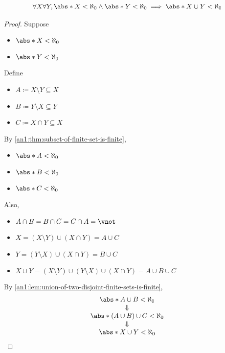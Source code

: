 \begin{lemma} \label{an1:lem:union-of-two-finite-sets-is-finite}
  \[
    \forall X \forall Y, \abs*{X} < \aleph_{0} \land \abs*{Y} < \aleph_{0}
    \implies \abs*{X \cup Y} < \aleph_{0}
  \]
\end{lemma}

\begin{proof}
  Suppose
  \begin{itemize}
    \item $\abs*{X} < \aleph_{0}$
    \item $\abs*{Y} < \aleph_{0}$
  \end{itemize}
  Define
  \begin{itemize}
    \item $A \coloneqq X \setminus Y \subseteq X$
    \item $B \coloneqq Y \setminus X \subseteq Y$
    \item $C \coloneqq X \cap Y \subseteq X$
  \end{itemize}
  By \cref{an1:thm:subset-of-finite-set-is-finite},
  \begin{itemize}
    \item $\abs*{A} < \aleph_{0}$
    \item $\abs*{B} < \aleph_{0}$
    \item $\abs*{C} < \aleph_{0}$
  \end{itemize}
  Also,
  \begin{itemize}
    \item $A \cap B = B \cap C = C \cap A = \vnot$
    \item $X = (X \setminus Y) \cup (X \cap Y) = A \cup C$
    \item $Y = (Y \setminus X) \cup (X \cap Y) = B \cup C$
    \item $X \cup Y = (X \setminus Y) \cup (Y \setminus X) \cup (X \cap Y) = A \cup B \cup C$
  \end{itemize}
  By \cref{an1:lem:union-of-two-disjoint-finite-sets-is-finite},
  \[
    \begin{array}{c}
      \abs*{A \cup B} < \aleph_{0}          \\
      \Downarrow                            \\
      \abs*{(A \cup B) \cup C} < \aleph_{0} \\
      \Downarrow                            \\
      \abs*{X \cup Y} < \aleph_{0}
    \end{array}
  \]
\end{proof}

